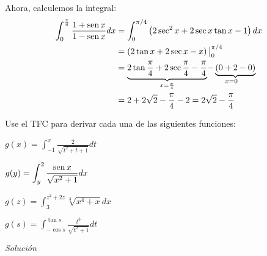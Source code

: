 \begin{parrafonumerado}
Ahora, calculemos la integral:
\begin{align*}
\int_{0}^{\frac{\pi }{4}}\frac{1+\operatorname{sen} x}{1-\operatorname{sen} x}dx&= \int_{0}^{\pi/4} \left(
2\sec ^{2}x+2\sec x\tan x-1\right) dx\\
&=\left( 2\tan x+2\sec x-x\right)\big|_{0}^{\pi/4}\\
&=\underset{x=\frac{\pi }{4}}{\underbrace{2\tan \frac{\pi }{4}+2\sec \frac{\pi }{4}-\frac{\pi }{4}}}\underset{x=0}{-\underbrace{(0+2-0)}}\\
&=2+2\sqrt{2}-\frac{\pi }{4}-2=2\sqrt{2}-\frac{\pi }{4}
\end{align*}

\end{parrafonumerado}

\begin{ejemplo}
Use el TFC para derivar cada una de las siguientes funciones:
\end{ejemplo}

\begin{parrafonumerado}

\item $g(x)=\displaystyle{\int_{-1}^{x}\frac{2}{\sqrt{t^{2}+t+1}}dt}$

\item $g(y)=\displaystyle{\int_{y}^{2}\frac{\operatorname{sen}x}{\sqrt{x^{2}+1}}dx}$

\item $g(z)=\displaystyle{\int_{3}^{z^{2}+2z}\sqrt[3]{x^{4}+x}dx}$

\item $g(s)=\displaystyle{\int_{-\cos s}^{\tan s}\frac{t^{3}}{\sqrt{t^{2}+1}}dt}$
\end{parrafonumerado}

\emph{Solución}

